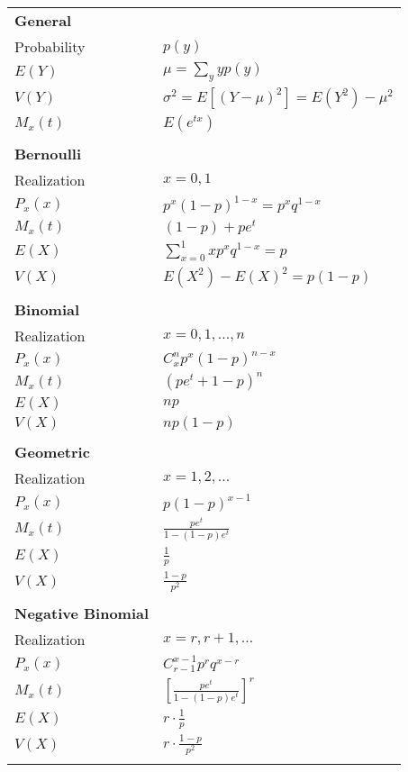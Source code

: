\documentclass[12pt]{article}
\newcommand{\bbb}[1]{\left[#1\right]}
\begin{document}
\begin{tabularx}{\textwidth}{X | X}
	\textbf{General} \\
	Probability & $p(y)$ \\
	$E(Y)$ & $\mu = \sum_y yp(y)$ \\
	$V(Y)$ & $\sigma^2 = E \bbb{(Y - \mu)^2} = E(Y^2) - \mu^2$ \\
	$M_x(t)$ & $E(e^{tx})$ \\\\
	\textbf{Bernoulli} \\
	Realization & $x = 0, 1$ \\
	$P_x(x)$ & $p^x(1-p)^{1-x} = p^x q^{1-x}$ \\
	$M_x(t)$ & $(1 - p) + pe^t$ \\
	$E(X)$ & $\sum_{x = 0}^1 x p^x q^{1-x} = p$ \\
	$V(X)$ & $E(X^2) - E(X)^2 = p(1 - p)$ \\\\
	\textbf{Binomial} \\
	Realization & $x = 0, 1, ..., n$ \\
	$P_x(x)$ & $C_x^n p^x (1-p)^{n - x}$ \\
	$M_x(t)$ & $(pe^t + 1 - p)^n$ \\
	$E(X)$ & $np$ \\
	$V(X)$ & $np(1 - p)$ \\\\
	\textbf{Geometric} \\
	Realization & $x = 1, 2, ...$ \\
	$P_x(x)$ & $p (1-p)^{x - 1}$ \\
	$M_x(t)$ & $\frac{pe^t}{1 - (1 - p)e^t}$ \\
	$E(X)$ & $\frac{1}{p}$ \\
	$V(X)$ & $\frac{1 - p}{p^2}$ \\\\
	\textbf{Negative Binomial} \\
	Realization & $x = r, r + 1, ...$ \\
	$P_x(x)$ & $C_{r - 1}^{x - 1} p^r q^{x - r}$ \\
	$M_x(t)$ & $\bbb{\frac{pe^t}{1 - (1 - p)e^t}}^r$ \\
	$E(X)$ & $r \cdot \frac{1}{p}$ \\
	$V(X)$ & $r \cdot \frac{1 - p}{p^2}$ \\\\
\end{tabularx}
\end{document}
